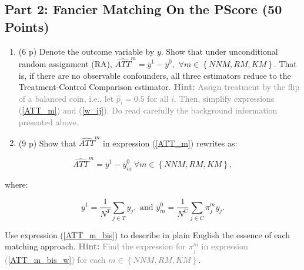 \documentclass[
]{article}
\begin{document}
\hypertarget{part-2-fancier-matching-on-the-pscore-50-points}{%
\subsection{Part 2: Fancier Matching On the PScore (50
Points)}\label{part-2-fancier-matching-on-the-pscore-50-points}}


\newpage

\begin{enumerate}
\def\labelenumi{\arabic{enumi}.}
\setcounter{enumi}{3}
\item
  (6 p) Denote the outcome variable by \(y\). Show that under
  unconditional random assignment (RA),
  \(\widehat{ATT}^{m}=\overline{y}^{1}-\overline{y}^{0},\)
  \(\forall m\in \left\{ NNM,RM,KM\right\}\). That is, if there are no
  observable confounders, all three estimators reduce to the
  Treatment-Control Comparison estimator.
  \textcolor{gray}{\textbf{Hint:} Assign treatment by the flip of a balanced coin, i.e., let $\widehat{p}_{i}=0.5$ for all $i$. Then, simplify expressions (\ref{ATT_m}) and (\ref{w_ij}). Do read carefully the background information presented above.}
\item
  (9 p) Show that \(\widehat{ATT}^{m}\) in expression (\ref{ATT_m})
  rewrites as:
\end{enumerate}

\begin{equation} \label{ATT_m_bis}
\widehat{ATT}^{m} =\overline{y}^{1}-\overline{y}_{m}^{0} \ \forall m\in \left\{ NNM,RM,KM\right\},
\end{equation}

\noindent where:

\begin{equation}\label{ATT_m_bis_w}
\overline{y}^{1} =\frac{1}{N^{T}}\sum_{j \in T}y_{j}, \text{     and      }  \overline{y}_{m}^{0} =\frac{1}{N^{C}}\sum_{j \in C}\pi_{j}^{m}y_{j}.
\end{equation}

\noindent Use expression (\ref{ATT_m_bis}) to describe in plain English
the essence of each matching approach.
\textcolor{gray}{\textbf{Hint:} Find the expression for $\pi _{j}^{m}$ in expression (\ref{ATT_m_bis_w}) for each $m\in \left\{NNM,RM,KM\right\} $}.
\end{document}

